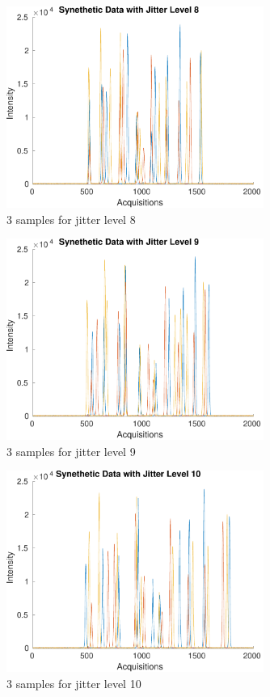 \documentclass[preprint,12pt]{elsarticle}
\begin{document}
\begin{figure}[h]
    \centering
    \includegraphics[width=0.75\textwidth]{figures/jitter_illustration8.pdf}
    \caption{3 samples for jitter level 8}
    \label{fig:figure8}
\end{figure}

\begin{figure}[h]
    \centering
    \includegraphics[width=0.75\textwidth]{figures/jitter_illustration9.pdf}
    \caption{3 samples for jitter level 9}
    \label{fig:figure9}
\end{figure}

\begin{figure}[h]
    \centering
    \includegraphics[width=0.75\textwidth]{figures/jitter_illustration10.pdf}
    \caption{3 samples for jitter level 10}
    \label{fig:figure10}
\end{figure}
\end{document}
